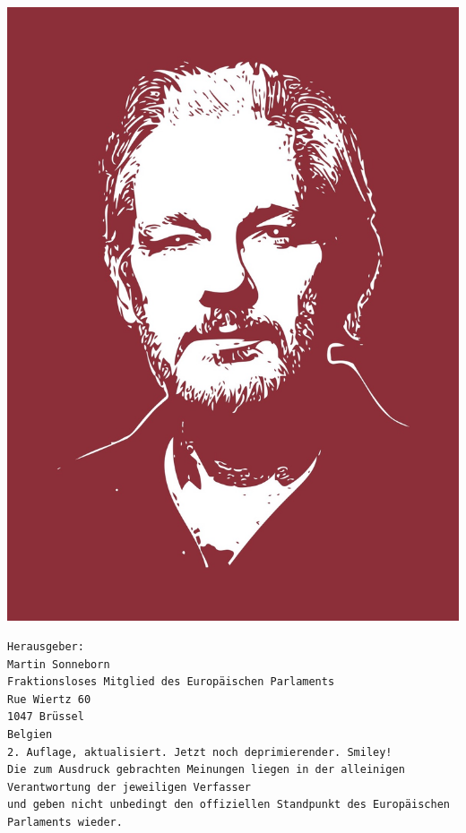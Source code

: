 \includegraphics[width=180mm]{assange.jpg}

\newpage
\thispagestyle{empty} %
\vspace*{\fill}
\begin{verbatim}
Herausgeber:
Martin Sonneborn
Fraktionsloses Mitglied des Europäischen Parlaments
Rue Wiertz 60
1047 Brüssel
Belgien
2. Auflage, aktualisiert. Jetzt noch deprimierender. Smiley!
Die zum Ausdruck gebrachten Meinungen liegen in der alleinigen Verantwortung der jeweiligen Verfasser
und geben nicht unbedingt den offiziellen Standpunkt des Europäischen Parlaments wieder.
\end{verbatim}
